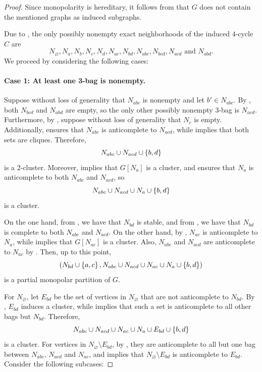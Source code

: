 \begin{proof}
    Since monopolarity is hereditary, it follows from
    that $G$ does not contain the mentioned graphs as induced subgraphs.

    Due to , the only possibly nonempty exact
    neighborhoods of the induced $4$-cycle $C$ are
    \[
        N_\varnothing, N_{a}, N_{b}, N_{c}, N_{d}, N_{ac}, N_{bd}, N_{abc}, N_{bcd},
        N_{acd} \text{ and } N_{abd}.
    \]
    We proceed by considering the following cases:

    \paragraph{Case 1: At least one 3-bag is nonempty.} Suppose without loss of
    generality that $N_{abc}$ is nonempty and let $b'\in N_{abc}$. By
    , both $N_{bcd}$ and $N_{abd}$ are empty, so the only other
    possibly nonempty 3-bag is $N_{acd}$. Furthermore, by ,
    suppose without loss of generality that $N_c$ is empty. Additionally,
     ensures that $N_{abc}$ is anticomplete to $N_{acd}$, while
     implies that both sets are cliques. Therefore,
    \[
        N_{abc} \cup N_{acd} \cup \left\{b,d\right\}
    \]
    is a 2-cluster. Moreover,  implies that $G[N_a]$ is a
    cluster, and  ensures that $N_a$ is anticomplete to both
    $N_{abc}$ and $N_{acd}$, so
    \[
        N_{abc}\cup N_{acd} \cup N_a \cup \left\{b,d\right\}
    \]
    is a cluster.

    On the one hand, from , we have that $N_{bd}$ is
    stable, and from , we have that $N_{bd}$ is complete to
    both $N_{abc}$ and $N_{acd}$. On the other hand, by ,
    $N_{ac}$ is anticomplete to $N_a$, while  implies that
    $G[N_{ac}]$ is a cluster. Also, $N_{abc}$ and $N_{acd}$ are anticomplete to
    $N_{ac}$ by . Then, up to this point,
    \[
        \left(N_{bd} \cup \left\{a,c\right\} , N_{abc} \cup N_{acd} \cup N_{ac} \cup N_{a} 
        \cup \left\{b,d\right\}\right)
    \]
    is a partial monopolar partition of $G$.

    For $N_\varnothing$, let $E_{bd}$ be the set of vertices in
    $N_{\varnothing}$ that are not anticomplete to $N_{bd}$. By
    , $E_{bd}$ induces a cluster, while 
    implies that such a set is anticomplete to all other bags but $N_{bd}$.
    Therefore,
    \[
        N_{abc} \cup N_{acd} \cup N_{ac} \cup N_{a} 
        \cup E_{bd} \cup \left\{b,d\right\}
    \]
    is a cluster. For vertices in $N_\varnothing\setminus E_{bd}$, by
    , they are anticomplete to all but one bag between
    $N_{abc}$, $N_{acd}$ and $N_{ac}$, and  implies that
    $N_\varnothing\setminus E_{bd}$ is anticomplete to $E_{bd}$. Consider the
    following subcases:


\end{proof}
